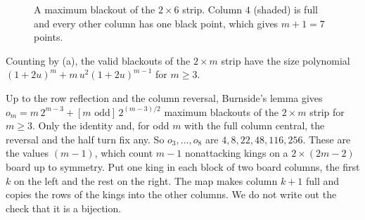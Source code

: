 \begin{figure}[t]
\centering

\caption{A maximum blackout of the $2\times6$ strip. Column $4$ (shaded) is full and
every other column has one black point, which gives $m+1=7$ points.}
\label{fig:stripmax}
\end{figure}

Counting by (a), the valid blackouts of the $2\times m$ strip have the size polynomial
$(1+2u)^m+m\,u^2(1+2u)^{m-1}$ for $m\ge3$.

\begin{remark}\label{rem:kings}
Up to the row reflection and the column reversal, Burnside's lemma gives
$o_m=m\,2^{m-3}+[m\text{ odd}]\,2^{(m-3)/2}$ maximum blackouts of the $2\times m$ strip for
$m\ge3$. Only the identity and, for odd $m$ with the full column central, the reversal and
the half turn fix any. So $o_3,\ldots,o_8$ are $4,8,22,48,116,256$. These are the values
$(m-1)$, which count $m-1$ nonattacking kings on a $2\times(2m-2)$ board up
to symmetry. Put one king in each block of two board columns, the first $k$ on the left and
the rest on the right. The map makes column $k+1$ full and copies the rows of the kings into
the other columns. We do not write out the check that it is a bijection.


\end{remark}
